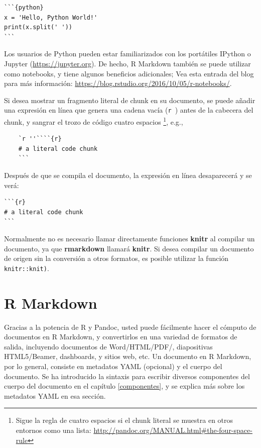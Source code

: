 \documentclass[12pt,]{krantz}
\theoremstyle{definition}
\theoremstyle{definition}
\theoremstyle{definition}
\theoremstyle{remark}
\begin{document}
\begin{verbatim}
```{python}
x = 'Hello, Python World!'
print(x.split(' '))
```
\end{verbatim}

Los usuarios de Python pueden estar familiarizados con los portátiles
IPython  o Jupyter
(\url{https://jupyter.org}). De hecho, R
Markdown también se puede utilizar como notebooks, y tiene algunos
beneficios adicionales; Vea esta entrada del blog para más información:
\url{https://blog.rstudio.org/2016/10/05/r-notebooks/}.

Si desea mostrar un fragmento literal de chunk en su documento, se puede
añadir una expresión en línea que genera una cadena vacía
(\texttt{\textasciigrave{}r\ \textquotesingle{}\textquotesingle{}\textasciigrave{}})
antes de la cabecera del chunk, y sangrar el trozo de código cuatro
espacios \footnote{Sigue la regla de cuatro espacios si el chunk literal
  se muestra en otros entornos como una lista:
  \url{http://pandoc.org/MANUAL.html\#the-four-space-rule}}, e.g.,

\begin{verbatim}
    `r ''````{r}
    # a literal code chunk
    ```
\end{verbatim}

Después de que se compila el documento, la expresión en línea
desaparecerá y se verá:

\begin{verbatim}
```{r}
# a literal code chunk
```
\end{verbatim}

Normalmente no es necesario llamar directamente funciones \textbf{knitr}
al compilar un documento, ya que \textbf{rmarkdown} llamará
\textbf{knitr}. Si desea compilar un documento de origen sin la
conversión a otros formatos, es posible utilizar la función
\texttt{knitr::knit)}.

\section{R Markdown}\label{r-markdown}

Gracias a la potencia de R y Pandoc, usted puede fácilmente hacer el
cómputo de documentos en R Markdown, y convertirlos en una variedad de
formatos de salida, incluyendo documentos de Word/HTML/PDF/,
diapositivas HTML5/Beamer, dashboards, y sitios web, etc. Un documento
en R Markdown, por lo general, consiste en metadatos YAML
(opcional) y el cuerpo del documento. Se ha introducido la sintaxis para
escribir diversos componentes del cuerpo del documento en el capítulo
\ref{componentes}, y se explica más sobre los metadatos YAML en esa
sección.
\end{document}
